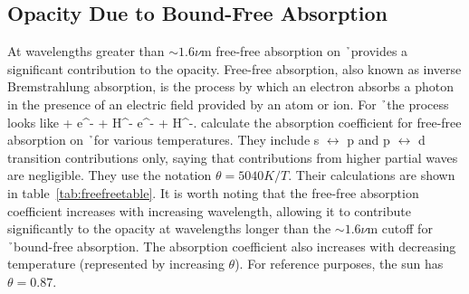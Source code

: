 \subsection{Opacity Due to Bound-Free Absorption}
At wavelengths greater than $\sim1.6\nu$m free-free absorption on \h\ provides a significant contribution to the opacity.  Free-free absorption, also known as inverse Bremstrahlung absorption, is the process by which an electron absorbs a photon in the presence of an electric field provided by an atom or ion.  For \h\ the process looks like
\beq
\gamma + e^- + H^- \rightarrow e^- + H^-.
\eeq
\cite{bell1987} calculate the absorption coefficient for free-free absorption on \h\ for various temperatures.  They include s $\leftrightarrow$ p and p $\leftrightarrow$ d transition contributions only, saying that contributions from higher partial waves are negligible.  They use the notation $\theta=5040 K /T$. Their calculations are shown in table~\ref{tab:freefreetable}.  It is worth noting that the free-free absorption coefficient increases with increasing wavelength, allowing it to contribute significantly to the opacity at wavelengths longer than the $\sim 1.6\nu$m cutoff for \h\ bound-free absorption.  The absorption coefficient also increases with decreasing temperature (represented by increasing $\theta$).  For reference purposes,  the sun has $\theta=0.87$.
